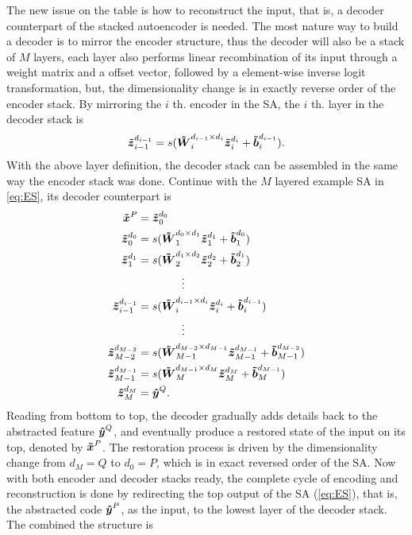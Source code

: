 The new issue on the table is how to reconstruct the input, that is, a decoder counterpart of the stacked autoencoder is needed. The most nature way to build a decoder is to mirror the encoder structure, thus the decoder will also be a stack of $M$ layers, each layer also performs linear recombination of its input through a weight matrix and a offset vector, followed by a element-wise inverse logit transformation, but, the dimensionality change is in exactly reverse order of the encoder stack. By mirroring the $i$ th. encoder in the SA, the $i$ th. layer in the decoder stack is
\begin{equation*}
  {\boldsymbol{\tilde{z}}_{i-1}^{d_{i-1}}} = s(\boldsymbol{\tilde{W}}_{i  }^{d_{i-1} \times d_{i  }} {\boldsymbol{\tilde{z}}_{i  }^{d_{i  }}} + \boldsymbol{\tilde{b}}_{i  }^{d_{i-1}}).
\end{equation*}
With the above layer definition, the decoder stack can be assembled in the same way the encoder stack was done. Continue with the $M$ layered example SA in \ref{eq:ES}, its decoder counterpart is
\begin{equation} \label{eq:DS}
\begin{split}
  \boldsymbol{\tilde{x}}^P &= {\boldsymbol{\tilde{z}}_{0}^{d_{0}}} \\
  {\boldsymbol{\tilde{z}}_{0  }^{d_{0  }}} &= s(\boldsymbol{\tilde{W}}_{1  }^{d_{0  } \times d_{1  }} {\boldsymbol{\tilde{z}}_{1  }^{d_{1  }}} + \boldsymbol{\tilde{b}}_{1  }^{d_{0  }}) \\
  {\boldsymbol{\tilde{z}}_{1  }^{d_{1  }}} &= s(\boldsymbol{\tilde{W}}_{2  }^{d_{1  } \times d_{2  }} {\boldsymbol{\tilde{z}}_{2  }^{d_{2  }}} + \boldsymbol{\tilde{b}}_{2  }^{d_{1  }}) \\
  & \quad \quad \quad \quad \vdots \\
  {\boldsymbol{\tilde{z}}_{i-1}^{d_{i-1}}} &= s(\boldsymbol{\tilde{W}}_{i  }^{d_{i-1} \times d_{i  }} {\boldsymbol{\tilde{z}}_{i  }^{d_{i  }}} + \boldsymbol{\tilde{b}}_{i  }^{d_{i-1}}) \\
  & \quad \quad \quad \quad \vdots \\
  {\boldsymbol{\tilde{z}}_{M-2}^{d_{M-2}}} &= s(\boldsymbol{\tilde{W}}_{M-1}^{d_{M-2} \times d_{M-1}} {\boldsymbol{\tilde{z}}_{M-1}^{d_{M-1}}} + \boldsymbol{\tilde{b}}_{M-1}^{d_{M-2}}) \\
  {\boldsymbol{\tilde{z}}_{M-1}^{d_{M-1}}} &= s(\boldsymbol{\tilde{W}}_{M  }^{d_{M-1} \times d_{M  }} {\boldsymbol{\tilde{z}}_{M  }^{d_{M  }}} + \boldsymbol{\tilde{b}}_{M  }^{d_{M-1}}) \\
  {\boldsymbol{\tilde{z}}_{M  }^{d_{M  }}} &= \boldsymbol{\hat{y}}^Q .
\end{split}
\end{equation}
Reading from bottom to top, the decoder gradually adds details back to the abstracted feature $\boldsymbol{\hat{y}}^Q$, and eventually produce a restored state of the input on its top, denoted by $\boldsymbol{\tilde{x}}^P$. The restoration process is driven by the dimensionality change from $d_M = Q$ to $d_0 = P$, which is in exact reversed order of the SA. Now with both encoder and decoder stacks ready, the complete cycle of encoding and reconstruction is done by redirecting the top output of the SA (\ref{eq:ES}), that is, the abstracted code $\boldsymbol{\hat{y}}^P$, as the input, to the lowest layer of the decoder stack. The combined the structure is
